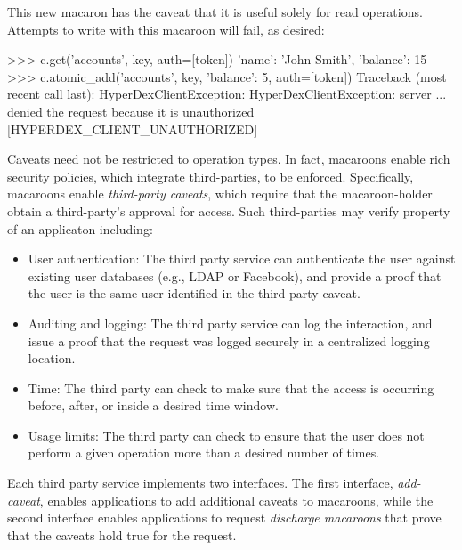 This new macaron has the caveat that it is useful solely for read operations. 
Attempts to write with this macaroon will fail, as desired:

\begin{pythoncode}
>>> c.get('accounts', key, auth=[token])
{'name': 'John Smith', 'balance': 15}
>>> c.atomic_add('accounts', key, {'balance': 5}, auth=[token])
Traceback (most recent call last):
HyperDexClientException: HyperDexClientException: server ... denied the request because it is unauthorized [HYPERDEX_CLIENT_UNAUTHORIZED]
\end{pythoncode}

Caveats need not be restricted to operation types. In fact, macaroons enable
rich security policies, which integrate third-parties, to be enforced. 
Specifically, macaroons enable {\em third-party caveats}, which require that
the macaroon-holder obtain a third-party's approval for access. 
Such third-parties may verify property of an applicaton including:

\begin{itemize}
    \item User authentication:  The third party service can authenticate the
        user against existing user databases (e.g., LDAP or Facebook), and
        provide a proof that the user is the same user identified in the third
        party caveat.
    \item Auditing and logging:  The third party service can log the
        interaction, and issue a proof that the request was logged securely in a
        centralized logging location.
    \item Time: The third party can check to make sure that the access is 
        occurring before, after, or inside a desired time window.
    \item Usage limits: The third party can check to ensure that the user
        does not perform a given operation more than a desired number of 
        times. 
\end{itemize}





Each third party service implements two interfaces.  The first interface, {\em
add-caveat}, enables applications to add additional caveats to macaroons, while
the second interface enables applications to request {\em discharge macaroons} that
prove that the caveats hold true for the request.

